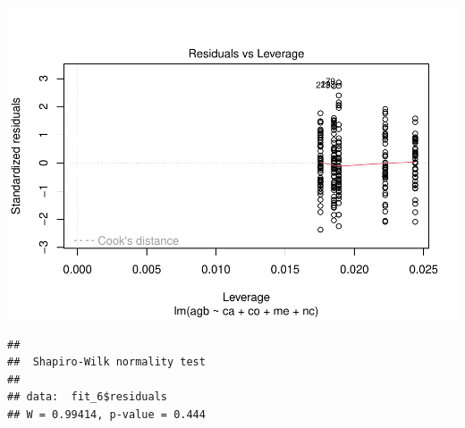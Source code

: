 \documentclass[
]{article}
\newenvironment{Shaded}{\begin{snugshade}}{\end{snugshade}}
\newcommand{\FunctionTok}[1]{\textcolor[rgb]{0.13,0.29,0.53}{\textbf{#1}}}
\newcommand{\NormalTok}[1]{#1}
\newcommand{\SpecialCharTok}[1]{\textcolor[rgb]{0.81,0.36,0.00}{\textbf{#1}}}
\begin{document}
\includegraphics{Stats-Lab-7_files/figure-latex/unnamed-chunk-16-4.pdf}

\begin{Shaded}
\end{Shaded}

\begin{verbatim}
## 
##  Shapiro-Wilk normality test
## 
## data:  fit_6$residuals
## W = 0.99414, p-value = 0.444
\end{verbatim}
\end{document}
